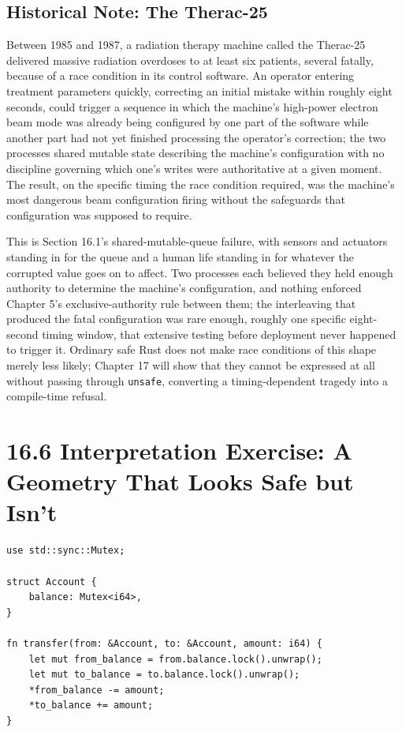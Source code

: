 \documentclass[11pt]{book}
\begin{document}
\subsection*{Historical Note: The Therac-25}

Between 1985 and 1987, a radiation therapy machine called the Therac-25 delivered massive radiation overdoses to at least six patients, several fatally, because of a race condition in its control software. An operator entering treatment parameters quickly, correcting an initial mistake within roughly eight seconds, could trigger a sequence in which the machine's high-power electron beam mode was already being configured by one part of the software while another part had not yet finished processing the operator's correction; the two processes shared mutable state describing the machine's configuration with no discipline governing which one's writes were authoritative at a given moment. The result, on the specific timing the race condition required, was the machine's most dangerous beam configuration firing without the safeguards that configuration was supposed to require.

This is Section 16.1's shared-mutable-queue failure, with sensors and actuators standing in for the queue and a human life standing in for whatever the corrupted value goes on to affect. Two processes each believed they held enough authority to determine the machine's configuration, and nothing enforced Chapter 5's exclusive-authority rule between them; the interleaving that produced the fatal configuration was rare enough, roughly one specific eight-second timing window, that extensive testing before deployment never happened to trigger it. Ordinary safe Rust does not make race conditions of this shape merely less likely; Chapter 17 will show that they cannot be expressed at all without passing through \texttt{unsafe}, converting a timing-dependent tragedy into a compile-time refusal.

\section*{16.6 Interpretation Exercise: A Geometry That Looks Safe but Isn't}

\begin{lstlisting}
use std::sync::Mutex;

struct Account {
    balance: Mutex<i64>,
}

fn transfer(from: &Account, to: &Account, amount: i64) {
    let mut from_balance = from.balance.lock().unwrap();
    let mut to_balance = to.balance.lock().unwrap();
    *from_balance -= amount;
    *to_balance += amount;
}
\end{lstlisting}
\end{document}
